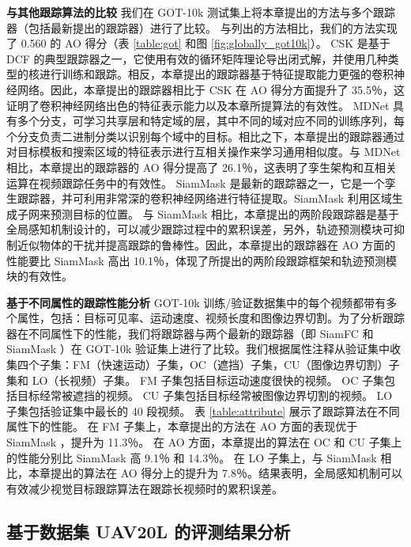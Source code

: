 \textbf{与其他跟踪算法的比较}
我们在 GOT-10k 测试集上将本章提出的方法与多个跟踪器（包括最新提出的跟踪器）进行了比较。
与列出的方法相比，我们的方法实现了 0.560 的 AO 得分（表 \ref{table:got} 和图 \ref{fig:globally_got10k}）。
CSK \cite{Henriques2012ExploitingTC} 是基于 DCF 的典型跟踪器之一，它使用有效的循环矩阵理论导出闭式解，并使用几种类型的核进行训练和跟踪。相反，本章提出的跟踪器基于特征提取能力更强的卷积神经网络。因此，本章提出的跟踪器相比于 CSK 在 AO 得分方面提升了 35.5％，这证明了卷积神经网络出色的特征表示能力以及本章所提算法的有效性。
MDNet \cite{MDNet} 具有多个分支，可学习共享层和特定域的层，其中不同的域对应不同的训练序列，每个分支负责二进制分类以识别每个域中的目标。相比之下，本章提出的跟踪器通过对目标模板和搜索区域的特征表示进行互相关操作来学习通用相似度。与 MDNet 相比，本章提出的跟踪器的 AO 得分提高了 26.1％，这表明了孪生架构和互相关运算在视频跟踪任务中的有效性。
SiamMask \cite{Wang2018SiamMask} 是最新的跟踪器之一，它是一个孪生跟踪器，并可利用非常深的卷积神经网络进行特征提取。SiamMask 利用区域生成子网来预测目标的位置。
与 SiamMask 相比，本章提出的两阶段跟踪器是基于全局感知机制设计的，可以减少跟踪过程中的累积误差，另外，轨迹预测模块可抑制近似物体的干扰并提高跟踪的鲁棒性。因此，本章提出的跟踪器在 AO 方面的性能要比 SiamMask 高出 10.1％，体现了所提出的两阶段跟踪框架和轨迹预测模块的有效性。

\textbf{基于不同属性的跟踪性能分析}
GOT-10k 训练/验证数据集中的每个视频都带有多个属性，包括：目标可见率、运动速度、视频长度和图像边界切割。为了分析跟踪器在不同属性下的性能，我们将跟踪器与两个最新的跟踪器（即 SiamFC \cite{SiamFC} 和 SiamMask \cite{Wang2018SiamMask}）在 GOT-10k 验证集上进行了比较。我们根据属性注释从验证集中收集四个子集：FM（快速运动）子集，OC（遮挡）子集，CU（图像边界切割）子集和 LO（长视频）子集。
FM 子集包括目标运动速度很快的视频。
OC 子集包括目标经常被遮挡的视频。
CU 子集包括目标经常被图像边界切割的视频。
LO 子集包括验证集中最长的 40 段视频。
表 \ref{table:attribute} 展示了跟踪算法在不同属性下的性能。
在 FM 子集上，本章提出的方法在 AO 方面的表现优于 SiamMask \cite{Wang2018SiamMask}，提升为 11.3％。
在 AO 方面，本章提出的算法在 OC 和 CU 子集上的性能分别比 SiamMask 高 9.1％ 和 14.3％。
在 LO 子集上，与 SiamMask 相比，本章提出的算法在 AO 得分上的提升为 7.8％。结果表明，全局感知机制可以有效减少视觉目标跟踪算法在跟踪长视频时的累积误差。

\subsection{基于数据集 UAV20L 的评测结果分析}

